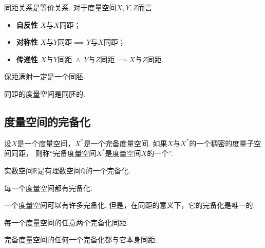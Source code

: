 \begin{proposition}
同距关系是等价关系.
对于度量空间\(X,Y,Z\)而言\begin{itemize}
	\item {\bf 自反性} \(X\)与\(X\)同距；
	\item {\bf 对称性} \(\text{$X$与$Y$同距} \implies \text{$Y$与$X$同距}\)；
	\item {\bf 传递性} \(\text{$X$与$Y$同距} \;\land\; \text{$Y$与$Z$同距} \implies \text{$X$与$Z$同距}\).
\end{itemize}
\end{proposition}

\begin{proposition}
保距满射一定是一个同胚.
\end{proposition}

\begin{proposition}
同距的度量空间是同胚的.
\end{proposition}

\subsection{度量空间的完备化}
\begin{definition}
设\(X\)是一个度量空间，\(X^*\)是一个完备度量空间.
如果\(X\)与\(X^*\)的一个稠密的度量子空间同距，
则称“完备度量空间\(X^*\)是度量空间\(X\)的一个”.
\end{definition}

\begin{proposition}
实数空间\(\mathbb{R}\)是有理数空间\(\mathbb{Q}\)的一个完备化.
\end{proposition}

\begin{theorem}
每一个度量空间都有完备化.
\end{theorem}

一个度量空间可以有许多完备化.
但是，在同距的意义下，它的完备化是唯一的.

\begin{theorem}
每一个度量空间的任意两个完备化同距.
\end{theorem}

\begin{corollary}
完备度量空间的任何一个完备化都与它本身同距.
\end{corollary}

